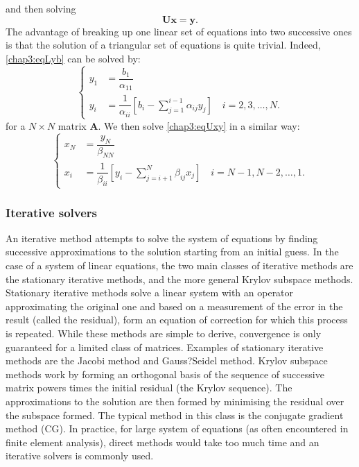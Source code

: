 and then solving 
\begin{equation}
\label{chap3:eqUxy}
\mathbf{U} \mathbf{x} = \mathbf{y}.
\end{equation}
The advantage of breaking up one linear set of equations into two successive ones is that the solution of a triangular set of equations is quite trivial. Indeed, \eqref{chap3:eqLyb} can be solved by:
\begin{equation} 
\left\lbrace
	\begin{aligned}
		y_1 &= \dfrac{b_1}{\alpha_{11}}  \\	
		y_i &= \dfrac{1}{\alpha_{ii}} \left[ b_i - \sum_{j=1}^{i-1} \alpha_{ij} y_j \right] \quad i = 2, 3, \ldots, N.
	\end{aligned} 
\right.
\end{equation}
for a $ N \times N $ matrix $ \mathbf{A} $. We then solve \eqref{chap3:eqUxy} in a similar way:
\begin{equation} 
\left\lbrace
	\begin{aligned}
		x_N &= \dfrac{y_N}{\beta_{NN}} \\	
		x_i &= \dfrac{1}{\beta_{ii}} \left[ y_i - \sum_{j=i+1}^{N} \beta_{ij} x_j \right] \quad i = N-1, N-2, \ldots, 1. 
	\end{aligned} 
\right.
\end{equation}


		\subsubsection*{Iterative solvers}
An iterative method attempts to solve the system of equations by finding successive approximations to the solution starting from an initial guess. In the case of a system of linear equations, the two main classes of iterative methods are the stationary iterative methods, and the more general Krylov subspace methods. Stationary iterative methods solve a linear system with an operator approximating the original one and based on a measurement of the error in the result (called the residual), form an equation of correction for which this process is repeated. While these methods are simple to derive, convergence is only guaranteed for a limited class of matrices. Examples of stationary iterative methods are the Jacobi method and Gauss?Seidel method. Krylov subspace methods work by forming an orthogonal basis of the sequence of successive matrix powers times the initial residual (the Krylov sequence). The approximations to the solution are then formed by minimising the residual over the subspace formed. The typical method in this class is the conjugate gradient method (CG). 
In practice, for large system of equations (as often encountered in finite element analysis), direct methods would take too much time and an iterative solvers is commonly used. 

